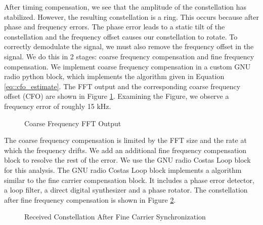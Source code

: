 \documentclass[conference,onecolumn]{IEEEtran}
\begin{document}
After timing compensation, we see that the amplitude of the constellation has stabilized. However, the resulting constellation is a ring. This occurs because after phase and frequency errors. The phase error leads to a static tilt of the constellation and the frequency offset causes our constellation to rotate. To correctly demodulate the signal, we must also remove the frequency offset in the signal. We do this in 2 stages: coarse frequency compensation and fine frequency compensation. We implement coarse frequency compensation in a custom GNU radio python block, which implements the algorithm given in Equation \ref{eq::cfo_estimate}. The FFT output and the corresponding coarse frequency offset (CFO) are shown in Figure \ref{fig::cfo_frequency_estimate}. Examining the Figure, we observe a frequency error of roughly 15 kHz.

\begin{figure}[H]
	\centerline{}
	\caption{Coarse Frequency FFT Output}
	\label{fig::cfo_frequency_estimate}
\end{figure}

The coarse frequency compensation is limited by the FFT size and the rate at which the frequency drifts. We add an additional fine frequency compensation block to resolve the rest of the error. We use the GNU radio Costas Loop block for this analysis. The GNU radio Costas Loop block implements a algorithm similar to the fine carrier compensation block. It includes a phase error detector, a loop filter, a direct digital synthesizer and a phase rotator. The constellation after fine frequency compensation is shown in Figure \ref{fig::constellation_after_fine_carrier_comp}.

\begin{figure}[H]
	\centerline{}
	\caption{Received Constellation After Fine Carrier Synchronization}
	\label{fig::constellation_after_fine_carrier_comp}
\end{figure}
\end{document}
